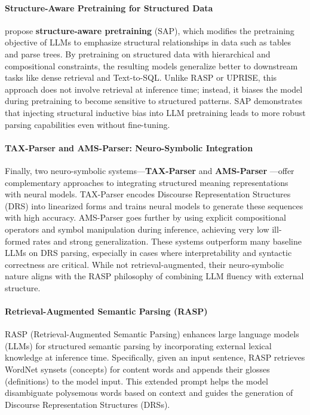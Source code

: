 \paragraph{Structure-Aware Pretraining for Structured Data}

\citet{li2023structure} propose \textbf{structure-aware pretraining} (SAP), which modifies the pretraining objective of LLMs to emphasize structural relationships in data such as tables and parse trees. By pretraining on structured data with hierarchical and compositional constraints, the resulting models generalize better to downstream tasks like dense retrieval and Text-to-SQL. Unlike RASP or UPRISE, this approach does not involve retrieval at inference time; instead, it biases the model during pretraining to become sensitive to structured patterns. SAP demonstrates that injecting structural inductive bias into LLM pretraining leads to more robust parsing capabilities even without fine-tuning.

\paragraph{TAX-Parser and AMS-Parser: Neuro-Symbolic Integration}

Finally, two neuro-symbolic systems—\textbf{TAX-Parser} \citep{zhang2024taxparser} and \textbf{AMS-Parser} \citep{yang2024amsparser}—offer complementary approaches to integrating structured meaning representations with neural models. TAX-Parser encodes Discourse Representation Structures (DRS) into linearized forms and trains neural models to generate these sequences with high accuracy. AMS-Parser goes further by using explicit compositional operators and symbol manipulation during inference, achieving very low ill-formed rates and strong generalization. These systems outperform many baseline LLMs on DRS parsing, especially in cases where interpretability and syntactic correctness are critical. While not retrieval-augmented, their neuro-symbolic nature aligns with the RASP philosophy of combining LLM fluency with external structure.

\paragraph{Retrieval-Augmented Semantic Parsing (RASP)}

RASP (Retrieval-Augmented Semantic Parsing) enhances large language models (LLMs) for structured semantic parsing by incorporating external lexical knowledge at inference time. Specifically, given an input sentence, RASP retrieves WordNet synsets (concepts) for content words and appends their glosses (definitions) to the model input. This extended prompt helps the model disambiguate polysemous words based on context and guides the generation of Discourse Representation Structures (DRSs).

